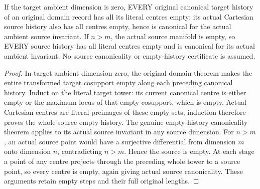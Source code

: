\begin{lemma}
\label{hir:smooth-original-ambient-zero-empty-histories}
\leanok
{}
If the target ambient dimension is zero, EVERY original canonical target
history of an original domain record has all its literal centres empty;
its actual Cartesian source history also has all centres empty, hence is
canonical for the actual ambient source invariant. If $n>m$, the actual
source manifold is empty, so EVERY source history has all literal centres
empty and is canonical for its actual ambient invariant. No source
canonicality or empty-history certificate is assumed.
\end{lemma}
\begin{proof}
In target ambient dimension zero, the original domain theorem makes the
entire transformed target cosupport empty along each preceding canonical
history. Induct on the literal target tower: its current canonical centre
is either empty or the maximum locus of that empty cosupport, which is
empty. Actual Cartesian centres are literal preimages of these empty sets;
induction therefore proves the whole source empty history. The genuine
empty-history canonicality theorem applies to its actual source invariant
in any source dimension. For $n>m$, an actual source point would have a
surjective differential from dimension $m$ onto dimension $n$, contradicting
$n>m$. Hence the source is empty. At each stage a point of any centre
projects through the preceding whole tower to a source point, so every
centre is empty, again giving actual source canonicality. These arguments
retain empty steps and their full original lengths.
\end{proof}

